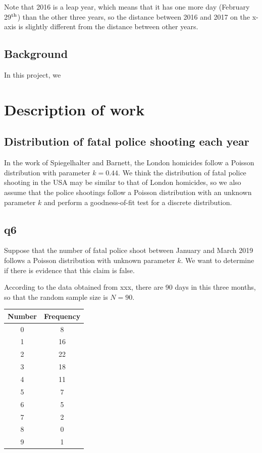 \documentclass[conf]{new-aiaa}
\begin{document}
Note that 2016 is a leap year, which means that it has one more day (February 29$^{\rm th}$) than the other three years, so the distance between 2016 and 2017 on the x-axis is slightly different from the distance between other years.

\subsection{Background}

In this project, we 

\newpage

\section{Description of work}

\subsection{Distribution of fatal police shooting each year}

In the work of Spiegelhalter and Barnett\cite{}, the London homicides follow a Poisson distribution with parameter $k = 0.44$. We think the distribution of fatal police shooting in the USA may be similar to that of London homicides, so we also assume that the police shootings follow a Poisson distribution with an unknown parameter $k$ and perform a goodness-of-fit test for a discrete distribution.



\subsection{q6}

Suppose that the number of fatal police shoot between January and March 2019 follows a Poisson distribution with unknown parameter $k$. We want
to determine if there is evidence that this claim is false.

According to the data obtained from xxx, there are 90 days in this three months, so that the random sample size is $N=90$.

\begin{tabular}{cc}
Number & Frequency \\\hline
0 & 8 \\
1 & 16 \\
2 & 22 \\
3 & 18 \\
4 & 11 \\
5 & 7 \\
6 & 5 \\
7 & 2 \\
8 & 0 \\
9 & 1 
\end{tabular}
\end{document}
